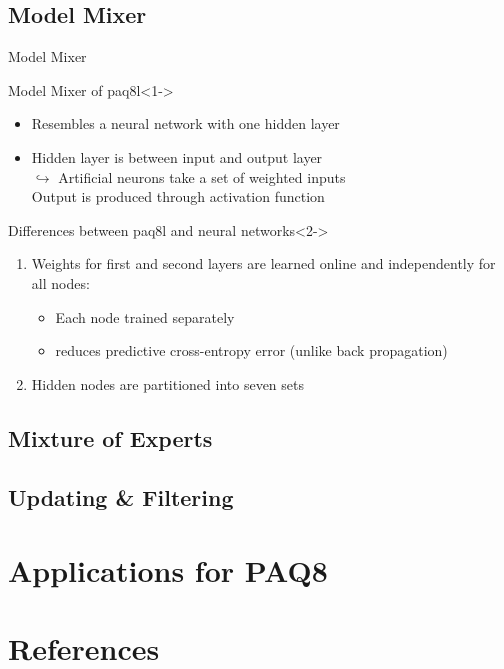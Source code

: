 \documentclass[11pt,usenames,dvipsnames]{beamer}
\begin{document}
\subsection{Model Mixer}
\begin{frame}{Model Mixer}
	\begin{exampleblock}{Model Mixer of paq8l}<1->
		\begin{itemize}
			\item Resembles a neural network with one hidden layer
			\item Hidden layer is between input and output layer\\
			$\hookrightarrow$ Artificial neurons take a set of weighted inputs\\
			Output is produced through activation function
		\end{itemize}
	\end{exampleblock}
	
	\begin{block}{Differences between paq8l and neural networks}<2->
		\begin{enumerate}
			\item Weights for first and second layers are learned online and independently for all nodes:
			\begin{itemize}
				\item Each node trained separately 
				\item reduces predictive cross-entropy error (unlike back propagation)
			\end{itemize}	
			\item Hidden nodes are partitioned into seven sets		 
		\end{enumerate}
	\end{block}
\end{frame}

\subsection{Mixture of Experts}
\subsection{Updating \& Filtering}
\section{Applications for PAQ8}
\section{References}
\end{document}
